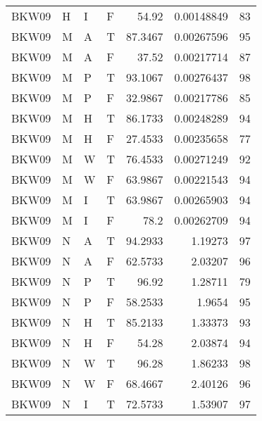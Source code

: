 \begin{longtable}{llllrrr}
    BKW09    & H         & I         & F          & 54.92      & 0.00148849  & 83       \\
    BKW09    & M         & A         & T          & 87.3467    & 0.00267596  & 95       \\
    BKW09    & M         & A         & F          & 37.52      & 0.00217714  & 87       \\
    BKW09    & M         & P         & T          & 93.1067    & 0.00276437  & 98       \\
    BKW09    & M         & P         & F          & 32.9867    & 0.00217786  & 85       \\
    BKW09    & M         & H         & T          & 86.1733    & 0.00248289  & 94       \\
    BKW09    & M         & H         & F          & 27.4533    & 0.00235658  & 77       \\
    BKW09    & M         & W         & T          & 76.4533    & 0.00271249  & 92       \\
    BKW09    & M         & W         & F          & 63.9867    & 0.00221543  & 94       \\
    BKW09    & M         & I         & T          & 63.9867    & 0.00265903  & 94       \\
    BKW09    & M         & I         & F          & 78.2       & 0.00262709  & 94       \\
    BKW09    & N         & A         & T          & 94.2933    & 1.19273     & 97       \\
    BKW09    & N         & A         & F          & 62.5733    & 2.03207     & 96       \\
    BKW09    & N         & P         & T          & 96.92      & 1.28711     & 79       \\
    BKW09    & N         & P         & F          & 58.2533    & 1.9654      & 95       \\
    BKW09    & N         & H         & T          & 85.2133    & 1.33373     & 93       \\
    BKW09    & N         & H         & F          & 54.28      & 2.03874     & 94       \\
    BKW09    & N         & W         & T          & 96.28      & 1.86233     & 98       \\
    BKW09    & N         & W         & F          & 68.4667    & 2.40126     & 96       \\
    BKW09    & N         & I         & T          & 72.5733    & 1.53907     & 97       \\

\end{longtable}
